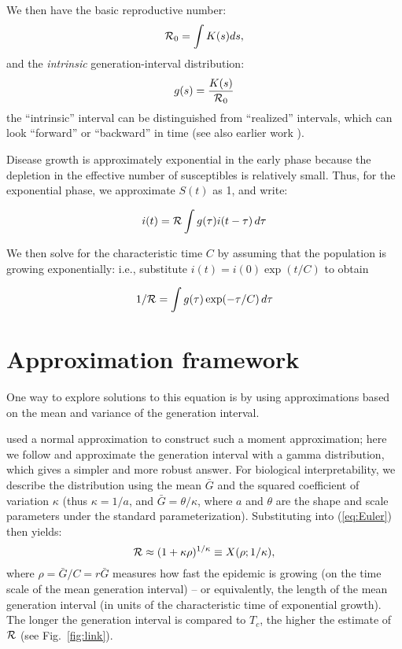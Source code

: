\documentclass[12pt,]{article}
\newcommand{\RR}{\ensuremath{{\cal R}}}
\newcommand{\Rx}[1]{\ensuremath{{\cal R}_{#1}}}
\newcommand{\Ro}{\Rx{0}}
\newcommand{\Tc}{\ensuremath{C}}
\newcommand{\eref}[1]{(\ref{eq:#1})}
\newcommand{\fref}[1]{Fig.~\ref{fig:#1}}
\begin{document}
We then have the basic reproductive number: $$\Ro = \int{K(s)ds},$$ and the \emph{intrinsic} generation-interval distribution: $$g(s) = \frac{K(s)}{\Ro}$$ the ``intrinsic'' interval can be distinguished from ``realized'' intervals, which can look ``forward'' or ``backward'' in time \cite{ChamDush15} (see also earlier work \cite{Sven07,Nish10}).

Disease growth is approximately exponential in the early phase because the depletion in the effective number of susceptibles is relatively small.
Thus, for the exponential phase, we approximate $S(t)$ as 1, and write:

$$i(t) = \RR\int{g(\tau)i(t-\tau) \,d\tau}$$

We then solve for the characteristic time $\Tc$ by assuming that the population is growing exponentially: i.e., substitute $i(t) = i(0) \exp(t/\Tc)$ to obtain

\begin{equation}
	1/\RR = \int{g(\tau)\exp(-\tau/\Tc) \,d\tau}\label{eq:Euler}
\end{equation}

\section{Approximation framework}

One way to explore solutions to this equation is by using approximations based on the mean and variance of the generation interval.

\cite{WallLips07} used a normal approximation to construct such a moment approximation; here we follow \cite{NishCast09} and approximate the generation interval with a gamma distribution, which gives a simpler and more robust answer.
For biological interpretability, we describe the distribution using the mean $\bar G$ and the squared coefficient of variation $\kappa$ (thus $\kappa = 1/a$, and $\bar G = \theta/\kappa$, where $a$ and $\theta$ are the shape and scale parameters under the standard parameterization).
Substituting into \eref{Euler} then yields:
\begin{equation}
	\RR \approx (1 + \kappa \rho)^{1/\kappa} \equiv X(\rho; 1/\kappa),
	\label{eq:genExp}
\end{equation}
where $\rho = \bar G/\Tc = r\bar G$ measures how fast the epidemic is growing (on the time scale of the mean generation interval) -- or equivalently, the length of the mean generation interval (in units of the characteristic time of exponential growth).
The longer the generation interval is compared to $T_c$, the higher the estimate of $\RR$ (see \fref{link}).
\end{document}
